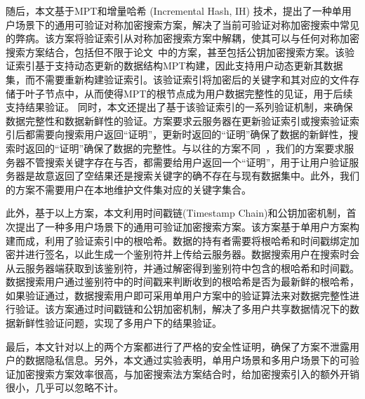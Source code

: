 随后，本文基于MPT和增量哈希 (Incremental Hash, IH) 技术，提出了一种单用户场景下的通用可验证对称加密搜索方案，解决了当前可验证对称加密搜索中常见的弊病。该方案将验证索引从对称加密搜索方案中解耦，使其可以与任何对称加密搜索方案结合，包括但不限于论文~\cite{stefanov2014practical,cash2014dynamic,kamara2012dynamic}中的方案，甚至包括公钥加密搜索方案。该验证索引基于支持动态更新的数据结构MPT构建，因此支持用户动态更新其数据集，而不需要重新构建验证索引。该验证索引将加密后的关键字和其对应的文件存储于叶子节点中，从而使得MPT的根节点成为用户数据完整性的见证，用于后续支持结果验证。
同时，本文还提出了基于该验证索引的一系列验证机制，来确保数据完整性和数据新鲜性的验证。方案要求云服务器在更新验证索引或搜索验证索引后都需要向搜索用户返回“证明”，更新时返回的“证明”确保了数据的新鲜性，搜索时返回的“证明”确保了数据的完整性。与以往的方案不同~\cite{kamara2011cs2,kurosawa2013update,stefanov2014practical}，我们的方案要求服务器不管搜索关键字存在与否，都需要给用户返回一个“证明”，用于让用户验证服务器是故意返回了空结果还是搜索关键字的确不存在与现有数据集中。此外，我们的方案不需要用户在本地维护文件集对应的关键字集合。

此外，基于以上方案，本文利用时间戳链(Timestamp Chain)和公钥加密机制，首次提出了一种多用户场景下的通用可验证加密搜索方案。该方案基于单用户方案构建而成，利用了验证索引中的根哈希。数据的持有者需要将根哈希和时间戳绑定加密并进行签名，以此生成一个鉴别符并上传给云服务器。数据搜索用户在搜索时会从云服务器端获取到该鉴别符，并通过解密得到鉴别符中包含的根哈希和时间戳。数据搜索用户通过鉴别符中的时间戳来判断收到的根哈希是否为最新鲜的根哈希，如果验证通过，数据搜索用户即可采用单用户方案中的验证算法来对数据完整性进行验证。该方案通过时间戳链和公钥加密机制，解决了多用户共享数据情况下的数据新鲜性验证问题，实现了多用户下的结果验证。

最后，本文针对以上的两个方案都进行了严格的安全性证明，确保了方案不泄露用户的数据隐私信息。另外，本文通过实验表明，单用户场景和多用户场景下的可验证加密搜索方案效率很高，与加密搜索法方案结合时，给加密搜索引入的额外开销很小，几乎可以忽略不计。


